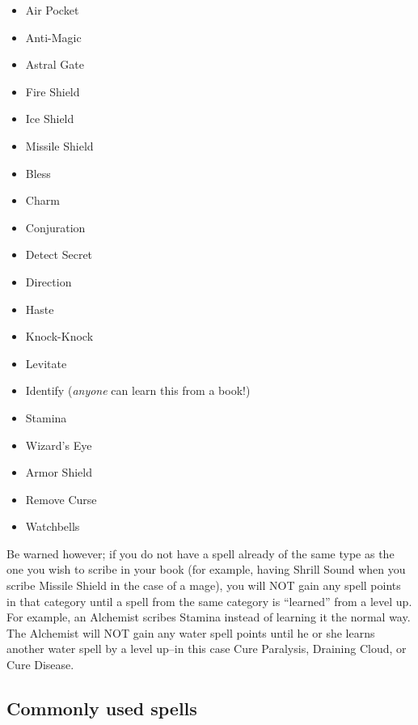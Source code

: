 \documentclass[12pt]{article}
\providecommand{\tightlist}{%
  \setlength{\itemsep}{0pt}\setlength{\parskip}{0pt}}
\begin{document}
\begin{itemize}
\tightlist
\item
  Air Pocket
\item
  Anti-Magic
\item
  Astral Gate
\item
  Fire Shield
\item
  Ice Shield
\item
  Missile Shield
\item
  Bless
\item
  Charm
\item
  Conjuration
\item
  Detect Secret
\item
  Direction
\item
  Haste
\item
  Knock-Knock
\item
  Levitate
\item
  Identify (\emph{anyone} can learn this from a book!)
\item
  Stamina
\item
  Wizard's Eye
\item
  Armor Shield
\item
  Remove Curse
\item
  Watchbells
\end{itemize}

Be warned however; if you do not have a spell already of the same type
as the one you wish to scribe in your book (for example, having Shrill
Sound when you scribe Missile Shield in the case of a mage), you will
NOT gain any spell points in that category until a spell from the same
category is ``learned'' from a level up. For example, an Alchemist
scribes Stamina instead of learning it the normal way. The Alchemist
will NOT gain any water spell points until he or she learns another
water spell by a level up--in this case Cure Paralysis, Draining Cloud,
or Cure Disease.

\subsection{Commonly used spells}\label{commonly-used-spells}
\end{document}
